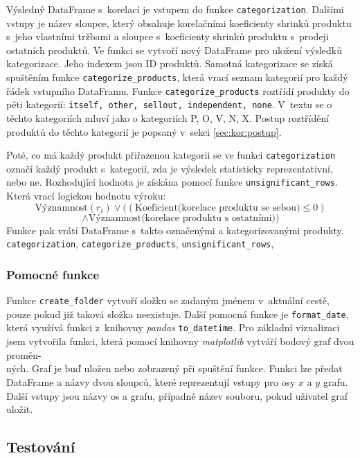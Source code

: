 Výsledný DataFrame s~korelací je vstupem do funkce \texttt{categorization}.  Dalšími vstupy je název sloupce, který obsahuje korelačními koeficienty shrinků produktu s~jeho vlastními tržbami a sloupce s~koeficienty shrinků produktu s~prodeji ostatních produktů. Ve funkci se vytvoří nový DataFrame pro uložení výsledků kategorizace. Jeho indexem jsou ID produktů. Samotná kategorizace se získá spuštěním funkce \texttt{categorize\_products}, která vrací seznam kategorií pro každý řádek vstupního DataFramu. Funkce \texttt{categorize\_products} roztřídí produkty do pěti kategorií: \texttt{itself, other, sellout, independent, none}. V~textu se o těchto kategoriích mluví jako o kategoriích P, O, V, N, X. Postup roztřídění produktů do těchto kategorií je popsaný v~sekci \ref{sec:kor:postup}.

Poté, co má každý produkt přiřazenou kategorii se ve funkci \texttt{categorization} označí každý produkt s~kategorií, zda je výsledek statisticky reprezentativní, nebo ne. Rozhodující hodnota je získána pomocí funkce \texttt{unsignificant\_rows}. Která vrací logickou hodnotu výroku:
$$ \mbox{Významnost}(r_i) \lor ( (\mbox{Koeficient(korelace produktu se sebou)} \leq 0) $$ 
$$ \land  \mbox{Významnost(korelace produktu s~ostatními)} ) $$
Funkce pak vrátí DataFrame s~takto označenými a kategorizovanými produkty.
\texttt{categorization}, \texttt{categorize\_products}, \texttt{unsignificant\_rows}, 

\subsubsection*{Pomocné funkce}

Funkce \texttt{create\_folder} vytvoří složku se zadaným jménem v~aktuální cestě, pouze pokud již taková složka neexistuje. Další pomocná funkce je \texttt{format\_date}, která využívá funkci z~knihovny \emph{pandas} \texttt{to\_datetime}. 
Pro základní vizualizaci jsem vytvořila funkci, která pomocí knihovny \emph{matplotlib} vytváří bodový graf dvou proměn-\\ných. Graf je buď uložen nebo zobrazený při spuštění funkce. Funkci lze předat DataFrame a názvy dvou sloupců, které reprezentují vstupy pro osy $x$ a $y$ grafu. Další vstupy jsou názvy os a grafu, případně název souboru, pokud uživatel graf uložit. 

\subsection{Testování}

